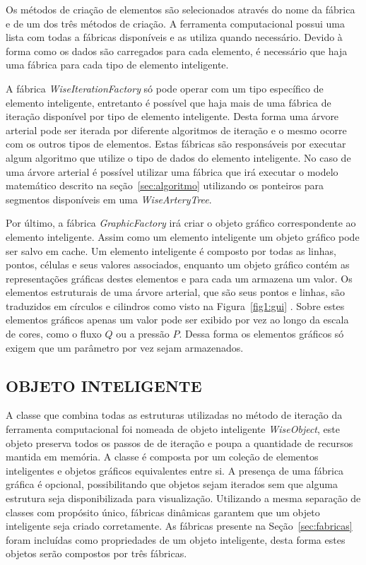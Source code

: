 \documentclass[
        english,			
        brazil			        %
        ,<...>]{abntbibufjf}
\begin{document}
Os métodos de criação de elementos são selecionados através do nome da fábrica e de um dos três métodos de criação. A ferramenta computacional possui uma lista com todas a fábricas disponíveis e as utiliza quando necessário. Devido à forma como os dados são carregados para cada elemento, é necessário que haja uma fábrica para cada tipo de elemento inteligente.

A fábrica \textit{WiseIterationFactory} só pode operar com um tipo específico de elemento inteligente, entretanto é possível que haja mais de uma fábrica de iteração disponível por tipo de elemento inteligente. Desta forma uma árvore arterial pode ser iterada por diferente algoritmos de iteração e o mesmo ocorre com os outros tipos de elementos. Estas fábricas são responsáveis por executar algum algoritmo que utilize o tipo de dados do elemento inteligente. No caso de uma árvore arterial é possível utilizar uma fábrica que irá executar o modelo matemático descrito na seção~\ref{sec:algoritmo} utilizando os ponteiros para segmentos disponíveis em uma \textit{WiseArteryTree}.

Por último, a fábrica \textit{GraphicFactory} irá criar o objeto gráfico correspondente ao elemento inteligente. Assim como um elemento inteligente um objeto gráfico pode ser salvo em cache.  Um elemento inteligente é composto por todas as linhas, pontos, células e seus valores associados, enquanto um objeto gráfico contém as representações gráficas destes elementos e para cada um armazena um valor. Os elementos estruturais de uma árvore arterial, que são seus pontos e linhas, são traduzidos em círculos e cilindros como visto na Figura~\ref{fig1:gui} . Sobre estes elementos gráficos apenas um valor pode ser exibido por vez ao longo da escala de cores, como o fluxo $Q$ ou a pressão $P$. Dessa forma os elementos gráficos só exigem que um parâmetro por vez sejam armazenados.


\subsection{OBJETO INTELIGENTE}\label{sec:objeto_inteligente}

A classe que combina todas as estruturas utilizadas no método de iteração da ferramenta computacional foi nomeada de objeto inteligente \textit{WiseObject}, este objeto preserva todos os passos de de iteração e poupa a quantidade de recursos mantida em memória. A classe é composta por um coleção de elementos inteligentes e objetos gráficos equivalentes entre si. A presença de uma fábrica gráfica é opcional, possibilitando que objetos sejam iterados sem que alguma estrutura seja disponibilizada para visualização. Utilizando a mesma separação de classes com propósito único, fábricas dinâmicas garantem que um objeto inteligente seja criado corretamente. As fábricas presente na Seção~\ref{sec:fabricas} foram incluídas como propriedades de um objeto inteligente, desta forma estes objetos serão compostos por três fábricas.
\end{document}
